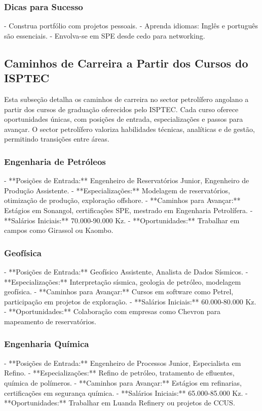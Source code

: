\documentclass[12pt]{article}
\begin{document}
\subsubsection{Dicas para Sucesso}
- Construa portfólio com projetos pessoais.
- Aprenda idiomas: Inglês e português são essenciais.
- Envolva-se em SPE desde cedo para networking.

\subsection{Caminhos de Carreira a Partir dos Cursos do ISPTEC}

Esta subseção detalha os caminhos de carreira no sector petrolífero angolano a partir dos cursos de graduação oferecidos pelo ISPTEC. Cada curso oferece oportunidades únicas, com posições de entrada, especializações e passos para avançar. O sector petrolífero valoriza habilidades técnicas, analíticas e de gestão, permitindo transições entre áreas.

\subsubsection{Engenharia de Petróleos}
- **Posições de Entrada:** Engenheiro de Reservatórios Junior, Engenheiro de Produção Assistente.
- **Especializações:** Modelagem de reservatórios, otimização de produção, exploração offshore.
- **Caminhos para Avançar:** Estágios em Sonangol, certificações SPE, mestrado em Engenharia Petrolífera.
- **Salários Iniciais:** 70.000-90.000 Kz.
- **Oportunidades:** Trabalhar em campos como Girassol ou Kaombo.

\subsubsection{Geofísica}
- **Posições de Entrada:** Geofísico Assistente, Analista de Dados Sísmicos.
- **Especializações:** Interpretação sísmica, geologia de petróleo, modelagem geofísica.
- **Caminhos para Avançar:** Cursos em software como Petrel, participação em projetos de exploração.
- **Salários Iniciais:** 60.000-80.000 Kz.
- **Oportunidades:** Colaboração com empresas como Chevron para mapeamento de reservatórios.

\subsubsection{Engenharia Química}
- **Posições de Entrada:** Engenheiro de Processos Junior, Especialista em Refino.
- **Especializações:** Refino de petróleo, tratamento de efluentes, química de polímeros.
- **Caminhos para Avançar:** Estágios em refinarias, certificações em segurança química.
- **Salários Iniciais:** 65.000-85.000 Kz.
- **Oportunidades:** Trabalhar em Luanda Refinery ou projetos de CCUS.
\end{document}
